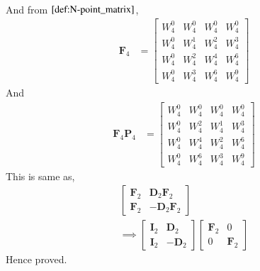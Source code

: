 \documentclass[journal,12pt,twocolumn]{IEEEtran}
\let\vec\mathbf
\numberwithin{equation}{section}
\renewcommand\thesection{\arabic{section}}
\begin{document}
\begin{enumerate}[label=\arabic*.,ref=\thesection.\theenumi]
\begin{align}
  \end{align}
And from $\eqref{def:N-point_matrix}$,
   \begin{align}
   	\vec{F}_{4} &= \begin{bmatrix}
   		             W_4^0 &  W_4^0& W_4^0 & W_4^0  \\
   		             W_4^0 & W_4^1 & W_4^2 & W_4^3  \\
   		             W_4^0 & W_4^2 & W_4^4 &  W_4^6 \\
   		             W_4^0 & W_4^3 & W_4^6 & W_4^9   
   	               \end{bmatrix}
   \end{align}
And 
   \begin{align}
   	\vec{F}_{4}\vec{P}_{4} &= \begin{bmatrix}
   		                        W_4^0 &  W_4^0& W_4^0 & W_4^0 \\
   		                       W_4^0 & W_4^2 & W_4^1 & W_4^3  \\
   		                       W_4^0 & W_4^4 & W_4^2 &  W_4^6 \\
   		                       W_4^0 & W_4^6 & W_4^3 & W_4^9       
   	                          \end{bmatrix}
   \end{align} 
  This is same as,
        \begin{align}
        	\begin{bmatrix}
        		\vec{F}_{2} & \vec{D}_{2}\vec{F}_{2} \\
        		\vec{F}_{2} & -\vec{D}_{2}\vec{F}_{2}
        	\end{bmatrix}\\
        \implies \begin{bmatrix}
        	\vec{I}_{2} & \vec{D}_{2} \\
        	\vec{I}_{2} & -\vec{D}_{2}
        \end{bmatrix}
        \begin{bmatrix}
        	\vec{F}_{2} & 0 \\
        	0 & \vec{F}_{2}   
        \end{bmatrix}   
        \end{align} 
    Hence proved.
      

\end{enumerate}
\end{document}
